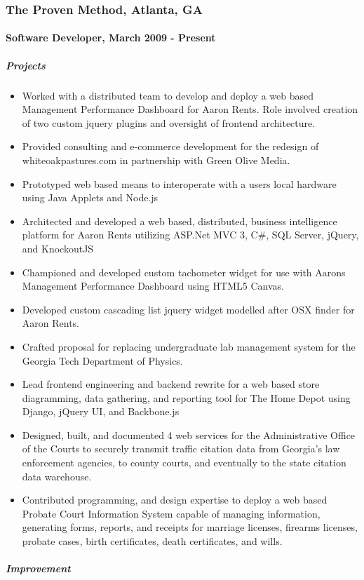 \subsubsection{The Proven Method, Atlanta, GA}

\paragraph{Software Developer, March 2009 - Present}

\subparagraph{Projects}

\begin{itemize}
\item
  Worked with a distributed team to develop and deploy a web based
  Management Performance Dashboard for Aaron Rents. Role involved
  creation of two custom jquery plugins and oversight of frontend
  architecture.
\item
  Provided consulting and e-commerce development for the redesign of
  whiteoakpastures.com in partnership with Green Olive Media.
\item
  Prototyped web based means to interoperate with a users local hardware
  using Java Applets and Node.js
\item
  Architected and developed a web based, distributed, business
  intelligence platform for Aaron Rents utilizing ASP.Net MVC 3, C\#,
  SQL Server, jQuery, and KnockoutJS
\item
  Championed and developed custom tachometer widget for use with Aarons
  Management Performance Dashboard using HTML5 Canvas.
\item
  Developed custom cascading list jquery widget modelled after OSX
  finder for Aaron Rents.
\item
  Crafted proposal for replacing undergraduate lab management system for
  the Georgia Tech Department of Physics.
\item
  Lead frontend engineering and backend rewrite for a web based store
  diagramming, data gathering, and reporting tool for The Home Depot
  using Django, jQuery UI, and Backbone.js
\item
  Designed, built, and documented 4 web services for the Administrative
  Office of the Courts to securely transmit traffic citation data from
  Georgia's law enforcement agencies, to county courts, and eventually
  to the state citation data warehouse.
\item
  Contributed programming, and design expertise to deploy a web based
  Probate Court Information System capable of managing information,
  generating forms, reports, and receipts for marriage licenses,
  firearms licenses, probate cases, birth certificates, death
  certificates, and wills.
\end{itemize}
\subparagraph{Improvement}

